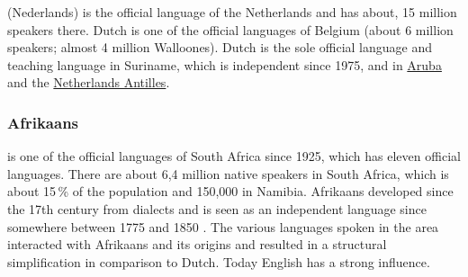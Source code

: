  (Nederlands) is the  official language of the Netherlands and has about, 15 million speakers
there. Dutch is one of the official languages of Belgium (about 6 million speakers; almost 4 million
Walloones). Dutch is the sole official language and teaching language in Suriname, which is
independent since 1975, 
and in \href{https://en.wikipedia.org/wiki/Aruba}{Aruba} and the \href{https://en.wikipedia.org/wiki/Netherlands_Antilles}{Netherlands Antilles}.


\subsubsection{Afrikaans}

 is one of the official languages of South Africa since 1925, which has eleven official languages.
There are about 6,4 million native speakers in South Africa, which is about 15\,\% of the population
and 150,000 in Namibia. Afrikaans developed since the 17th century from  dialects and is seen
as an independent language since somewhere between 1775 and 1850 \citep{denBesten2012a-u}.
The various languages spoken in
the area interacted with Afrikaans and its origins and resulted in a structural simplification in
comparison to Dutch. Today English has a strong influence.



